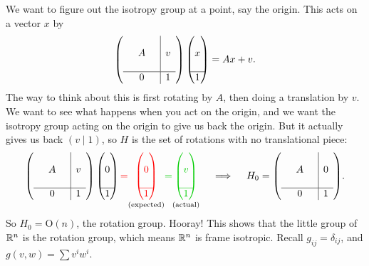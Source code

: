     We want to figure out the isotropy group at a point, say the origin. This acts on a vector $x$ by \[
    \mleft(\begin{array}{ccc|c}
    & & &  \\
    & A & &v \\
    & & &  \\
    \hline
    & 0 & &  1
\end{array}\mright)
\begin{pmatrix}
    \\
    x\\
    \\
    \hline
    1
\end{pmatrix}=Ax+v.
    \] The way to think about this is first rotating by $A$, then doing a translation by $v$. We want to see what happens when you act on the origin, and we want the isotropy group acting on the origin to give us back the origin. But it actually gives us back $(v\mid 1)$, so $H$ is the set of rotations with no translational piece: \[
    \mleft(\begin{array}{ccc|c}
    & & &  \\
    & A & &v \\
    & & &  \\
    \hline
    & 0 & &  1
\end{array}\mright)
\begin{pmatrix}
    \\
    0\\
    \\
    \hline
    1
\end{pmatrix}{\color{red}=}\underset{\text{(expected)}}{{\color{red}
\begin{pmatrix}
    \\ 0 \\ \\ \hline 1
\end{pmatrix}
}}{\color{green!80!black}=}\underset{\text{(actual)}}{
{\color{green!80!black}
\begin{pmatrix}
    \\ v \\ \\ \hline 1
\end{pmatrix}} } \quad \implies \quad H_0=
    \mleft(\begin{array}{ccc|c}
    & & &  \\
    & A & &0 \\
    & & &  \\
    \hline
    & 0 & &  1
\end{array}\mright).
\] 
So $H_0=\mathrm O(n)$, the rotation group. Hooray! This shows that the little group of $\mathbb{R}^n $ is the rotation group, which means $\mathbb{R}^n $ is frame isotropic. Recall $g_{ij} =\delta_{ij} $, and $g(v,w)=\sum v^i w^i $.

